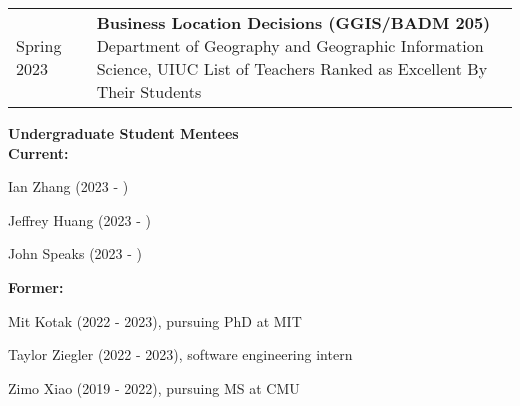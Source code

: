 \documentclass{acmcv}
\begin{document}
    \begin{longtable}{p{0.16\linewidth} p{0.84\linewidth}}
        Spring 2023 & \textbf{Business Location Decisions (GGIS/BADM 205)} \newline Department of Geography and Geographic Information Science, UIUC \newline
        List of Teachers Ranked as Excellent By Their Students \\

    \end{longtable}
    \pagebreak
    \textbf{Undergraduate Student Mentees}\\
    \textbf{Current:}
    \vspace*{-0.3cm}
    \begin{multicols}{2}
        \begin{titemize}
            \item Ian Zhang (2023 - )
            \item Jeffrey Huang (2023 - )
            \item John Speaks (2023 - )
        \end{titemize}
    \end{multicols}
    \vspace*{-0.25cm}
    \textbf{Former:}
    \begin{titemize}
        \item Mit Kotak (2022 - 2023), pursuing PhD at MIT
        \item Taylor Ziegler (2022 - 2023), software engineering intern
        \item Zimo Xiao (2019 - 2022), pursuing MS at CMU
    \end{titemize}
    \vspace*{0.5cm}


\end{document}
